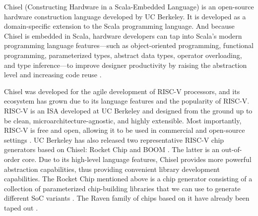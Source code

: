 \documentclass[conference]{IEEEtran}
\theoremstyle{definition}
\begin{document}
Chisel (Constructing Hardware in a Scala-Embedded Language) is an open-source hardware construction language developed by UC Berkeley. It is developed as a domain-specific extension to the Scala programming language. And because Chisel is embedded in Scala, hardware developers can tap into Scala’s modern programming language features—such as object-oriented programming, functional programming, parameterized types, abstract data types, operator overloading, and type inference—to improve designer productivity by raising the abstraction level and increasing code reuse \cite{lee2016agile}.

Chisel was developed for the agile development of RISC-V processors, and its ecosystem has grown due to its language features and the popularity of RISC-V.
RISC-V is an ISA developed at UC Berkeley and designed from the ground up to be clean, microarchitecture-agnostic, and highly extensible. Most importantly, RISC-V is free and open, allowing it to be used in commercial and open-source settings \cite{asanovic2014instruction}.
UC Berkeley has also released two representative RISC-V chip generators based on Chisel: Rocket Chip \cite{asanovic2016rocket} and BOOM \cite{celio2017boomv2}.
The latter is an out-of-order core.
Due to its high-level language features, Chisel provides more powerful abstraction capabilities, thus providing convenient library development capabilities. 
The Rocket Chip mentioned above is a chip generator consisting of a collection of parameterized chip-building libraries that we can use to generate different SoC variants \cite{asanovic2016rocket}.
The Raven family of chips based on it have already been taped out \cite{lee2015raven}.
\end{document}
